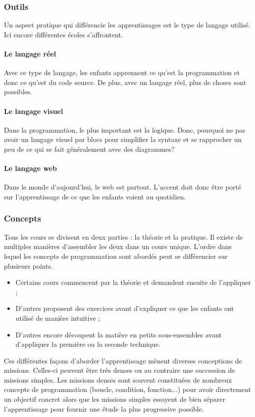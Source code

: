 \subsubsection{Outils} 
Un aspect pratique qui différencie les apprentissages est le type de langage utilisé. Ici encore différentes écoles s'affrontent.

\paragraph{Le langage réel} Avec ce type de langage, les enfants apprennent ce qu'est la programmation et donc ce qu'est du code source. De plus, avec un langage réel, plus de choses sont possibles.
\paragraph{Le langage visuel} Dans la programmation, le plus important est la logique. Donc, pourquoi ne pas avoir un langage visuel par blocs pour simplifier la syntaxe et se rapprocher un peu de ce qui se fait généralement avec des diagrammes?
\paragraph{Le langage web} Dans le monde d'aujourd'hui, le web est partout. L'accent doit donc être porté sur l'apprentissage de ce que les enfants voient au quotidien.


\subsubsection{Concepts} 
Tous les cours se divisent en deux parties : la théorie et la pratique. Il existe de multiples manières d'assembler les deux dans un cours unique. L'ordre dans lequel les concepts de programmation sont abordés peut se différencier sur plusieurs points.
\begin{itemize}
  \item Certains cours commencent par la théorie et demandent ensuite de l'appliquer ;
  \item D'autres proposent des exercices avant d'expliquer ce que les enfants ont utilisé de manière intuitive ;
  \item D'autres encore découpent la matière en petits sous-ensembles avant d'appliquer la première ou la seconde technique.\\
\end{itemize}


Ces différentes façons d'aborder l'apprentissage mènent diverses conceptions de missions. Celles-ci peuvent être très denses ou au contraire une succession de missions simples. Les missions denses sont souvent constituées de nombreux concepts de programmation (boucle, condition, fonction...) pour avoir directement un objectif concret alors que les missions simples essayent de bien séparer l'apprentissage pour fournir une étude la plus progressive possible.\\

